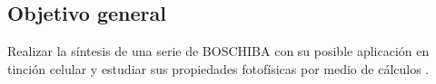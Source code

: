 \subsection{Objetivo general}
Realizar la síntesis de una serie de \gls{BOSCHIBA} con su posible aplicación en tinción celular y estudiar sus propiedades fotofísicas por medio de cálculos \insilico{}.